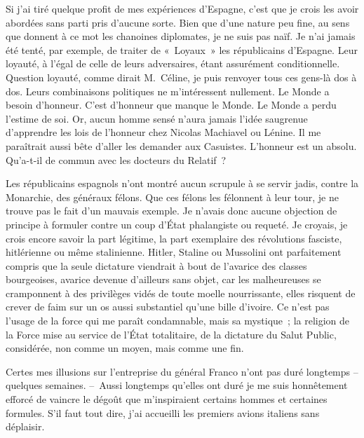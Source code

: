 \documentclass[french,twoside]{book} %
\newcommand{\astertri}{\medskip\par\centerline{\color{rubric}\large\selectfont{\syms ✻\,✻\,✻}}\medskip\par}%
\begin{document}
\astertri

\noindent Si j’ai tiré quelque profit de mes expériences d’Espagne, c’est que je crois les avoir abordées sans parti pris d’aucune sorte. Bien que d’une nature peu fine, au sens que donnent à ce mot les chanoines diplomates, je ne suis pas naïf. Je n’ai jamais été tenté, par exemple, de traiter de « Loyaux » les républicains d’Espagne. Leur loyauté, à l’égal de celle de leurs adversaires, étant assurément conditionnelle. Question loyauté, comme dirait M. Céline, je puis renvoyer tous ces gens-là dos à dos. Leurs combinaisons politiques ne m’intéressent nullement. Le Monde a besoin d’honneur. C’est d’honneur que manque le Monde. Le Monde a perdu l’estime de soi. Or, aucun homme sensé n’aura jamais l’idée saugrenue d’apprendre les lois de l’honneur chez Nicolas Machiavel ou Lénine. Il me paraîtrait aussi bête d’aller les demander aux Casuistes. L’honneur est un absolu. Qu’a-t-il de commun avec les docteurs du Relatif ?\par
Les républicains espagnols n’ont montré aucun scrupule à se servir jadis, contre la Monarchie, des généraux félons. Que ces félons les félonnent à leur tour, je ne trouve pas le fait d’un mauvais exemple. Je n’avais donc aucune objection de principe à formuler contre un coup d’État phalangiste ou requeté. Je croyais, je crois encore savoir la part légitime, la part exemplaire des révolutions fasciste, hitlérienne ou même stalinienne. Hitler, Staline ou Mussolini ont parfaitement compris que la seule dictature viendrait à bout de l’avarice des classes bourgeoises, avarice devenue d’ailleurs sans objet, car les malheureuses se cramponnent à des privilèges vidés de toute moelle nourrissante, elles risquent de crever de faim sur un os aussi substantiel qu’une bille d’ivoire. Ce n’est pas l’usage de la force qui me paraît condamnable, mais sa mystique ; la religion de la Force mise au service de l’État totalitaire, de la dictature du Salut Public, considérée, non comme un moyen, mais comme une fin.\par
Certes mes illusions sur l’entreprise du général Franco n’ont pas duré longtemps – quelques semaines. – Aussi longtemps qu’elles ont duré je me suis honnêtement efforcé de vaincre le dégoût que m’inspiraient certains hommes et certaines formules. S’il faut tout dire, j’ai accueilli les premiers avions italiens sans déplaisir.\par
\end{document}
